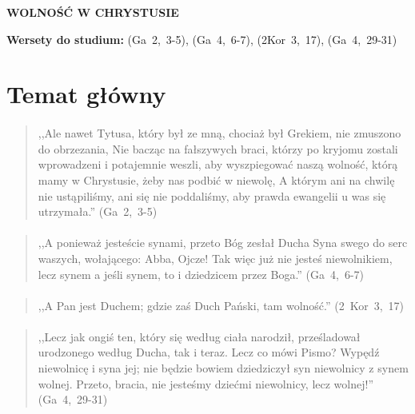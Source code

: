 \documentclass[10pt,a4paper,oneside]{article}
\begin{document}
\centerline{\textbf{\MakeUppercase{Wolność w Chrystusie}}}
\begin{center}
\textbf{Wersety do studium:} 
\mbox{(Ga 2, 3-5)}, \mbox{(Ga 4, 6-7)}, \mbox{(2Kor 3, 17)}, \mbox{(Ga 4, 29-31)}
\end{center}
\section{Temat główny}
\paragraph{}
\begin{quote}
,,Ale nawet Tytusa, który był ze mną, chociaż był Grekiem, nie zmuszono do obrzezania, Nie bacząc na fałszywych braci, którzy po kryjomu zostali wprowadzeni i potajemnie weszli, aby wyszpiegować naszą wolność, którą mamy w Chrystusie, żeby nas podbić w niewolę, A którym ani na chwilę nie ustąpiliśmy, ani się nie poddaliśmy, aby prawda ewangelii u was się utrzymała.'' \mbox{(Ga 2, 3-5)}
\end{quote}
\paragraph{}
\begin{quote}
,,A ponieważ jesteście synami, przeto Bóg zesłał Ducha Syna swego do serc waszych, wołającego: Abba, Ojcze! Tak więc już nie jesteś niewolnikiem, lecz synem a jeśli synem, to i dziedzicem przez Boga.'' \mbox{(Ga 4, 6-7)}
\end{quote}
\paragraph{}
\begin{quote}
,,A Pan jest Duchem; gdzie zaś Duch Pański, tam wolność.'' \mbox{(2 Kor 3, 17)}
\end{quote}
\paragraph{}
\begin{quote}
,,Lecz jak ongiś ten, który się według ciała narodził, prześladował urodzonego według Ducha, tak i teraz. Lecz co mówi Pismo? Wypędź niewolnicę i syna jej; nie będzie bowiem dziedziczył syn niewolnicy z synem wolnej. Przeto, bracia, nie jesteśmy dziećmi niewolnicy, lecz wolnej!'' \mbox{(Ga 4, 29-31)}
\end{quote}
\end{document}
